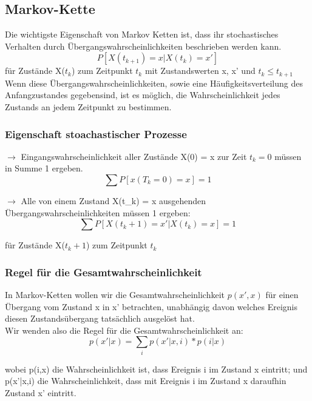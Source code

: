 \documentclass{report}
\theoremstyle{definition}
\theoremstyle{example}
\begin{document}
   \subsection{Markov-Kette}
Die wichtigste Eigenschaft von Markov Ketten ist, dass ihr stochastisches Verhalten durch Übergangswahrscheinlichkeiten beschrieben werden kann.
\begin{equation}
   P[X(t_{k+1}) = x | X(t_k) = x']
\end{equation}
für Zustände X($t_k$) zum Zeitpunkt $t_k$ mit Zustandswerten x, x' und $t_k \leq t_{k+1}$\\
Wenn diese Übergangswahrscheinlichkeiten, sowie eine Häufigkeitsverteilung des Anfangzustandes gegebensind, ist es möglich, die Wahrscheinlichkeit jedes Zustands an jedem Zeitpunkt zu bestimmen.

      \subsubsection{Eigenschaft stoachastischer Prozesse}
$\rightarrow$ Eingangswahrscheinlichkeit aller Zustände X(0) = x zur Zeit $t_k = 0$ müssen in Summe 1 ergeben. 
\begin{equation}
   \sum P[x(T_k = 0) = x] = 1
\end{equation} 

$\rightarrow$ Alle von einem Zustand X(t_k) = x ausgehenden Übergangswahrscheinlichkeiten müssen 1 ergeben:
\begin{equation}
   \sum P[X(t_k+1) = x' | X(t_k) = x] = 1
\end{equation}

für Zustände X($t_k+1$) zum Zeitpunkt $t_k$

      \subsubsection{Regel für die Gesamtwahrscheinlichkeit}
In Markov-Ketten wollen wir die Gesamtwahrscheinlichkeit $p(x',x)$ für einen Übergang vom Zustand x in x' betrachten, unabhängig davon welches Ereignis diesen Zustandsübergang tatsächlich ausgelöst hat.\\
Wir wenden also die Regel für die Gesamtwahrscheinlichkeit an:
\begin{equation}
   p(x'|x) = \sum_i p(x' | x,i) * p(i|x)
\end{equation}

wobei p(i,x) die Wahrscheinlichkeit ist, dass Ereignis i im Zustand x eintritt; und p(x'|x,i) die Wahrscheinlichkeit, dass mit Ereignis i im Zustand x daraufhin Zustand x' eintritt.
\end{document}
